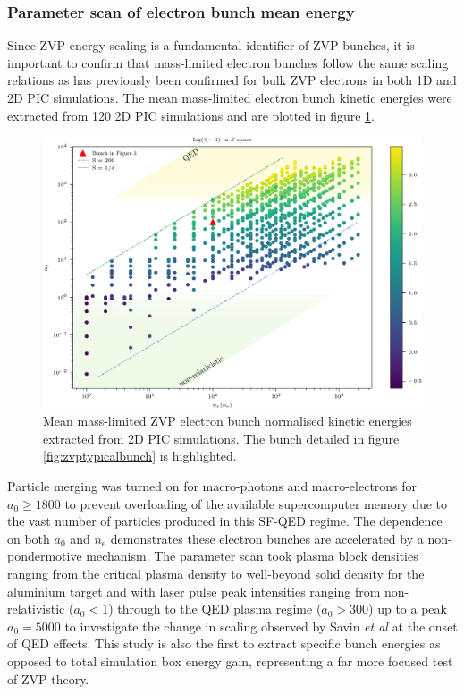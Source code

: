 \subsubsection{Parameter scan of electron bunch mean energy}
Since ZVP energy scaling is a fundamental identifier of ZVP bunches, it is important to confirm that mass-limited electron bunches follow the same scaling relations as has previously been confirmed for bulk ZVP electrons in both 1D \cite{baevaZeroVectorPotential2011} and 2D \cite{savinAttosecondscaleAbsorptionExtreme2017} PIC simulations. The mean mass-limited electron bunch kinetic energies were extracted from 120 2D PIC simulations and are plotted in figure \ref{fig:zvpmeangammas}. 
\begin{figure}
	\centering
	\includegraphics[width=1\linewidth]{figures/zvp/zvp_mean_gammas}
	\caption[Mean mass-limited ZVP electron bunch normalised kinetic energies extracted from 2D PIC simulations.]{Mean mass-limited ZVP electron bunch normalised kinetic energies extracted from 2D PIC simulations. The bunch detailed in figure \ref{fig:zvptypicalbunch} is highlighted.}
	\label{fig:zvpmeangammas}
\end{figure}
Particle merging was turned on for macro-photons and macro-electrons for $a_0 \ge 1800$ to prevent overloading of the available supercomputer memory due to the vast number of particles produced in this SF-QED regime. The dependence on both $a_0$ and $n_\mathrm{e}$ demonstrates these electron bunches are accelerated by a non-pondermotive mechanism. The parameter scan took plasma block densities ranging from the critical plasma density to well-beyond solid density for the aluminium target and with laser pulse peak intensities ranging from non-relativistic ($a_0 < 1$) through to the \ac{QED} plasma regime ($a_0 > 300$) up to a peak $a_0 = 5000$ to investigate the change in scaling observed by Savin \textit{et al} \cite{savinEnergyAbsorptionLaserQED2019} at the onset of QED effects. This study is also the first to extract specific bunch energies as opposed to total simulation box energy gain, representing a far more focused test of ZVP theory.

